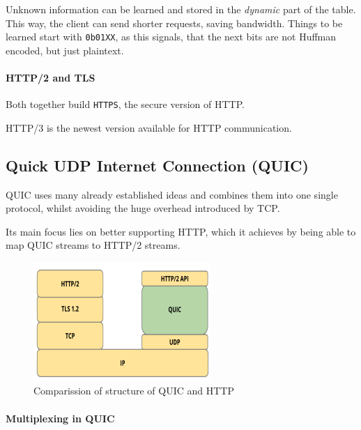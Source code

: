 \documentclass[english]{panikzettel}
\begin{document}
	Unknown information can be learned and stored in the \textit{dynamic} part of the table.
	This way, the client can send shorter requests, saving bandwidth.
	Things to be learned start with \texttt{0b01XX}, as this signals, that the next bits are not Huffman encoded, but just plaintext.
	
	\paragraph{HTTP/2 and TLS}
	\label{pgf-http/2-and-tls}
	
	Both together build \texttt{HTTPS}, the secure version of HTTP.

	\vspace{0.5cm}
	\begin{alertbox}
		HTTP/3 is the newest version available for HTTP communication. 
	\end{alertbox}
	
	\subsection{Quick UDP Internet Connection (QUIC)}
	\label{ss-quick-udp-internet-connection-quic}

	QUIC uses many already established ideas and combines them into one single protocol, whilst avoiding the huge overhead introduced by TCP.

	Its main focus lies on better supporting HTTP, which it achieves by being able to map QUIC streams to HTTP/2 streams.
	
	\begin{figure}[H]
		\centering
		\includegraphics[width=0.6\textwidth]{img/2-quic-vs-http.png}
		\caption{Comparission of structure of QUIC and HTTP}
		\label{img-2-quic-vs-http}
	\end{figure}

	\paragraph{Multiplexing in QUIC}
	\label{pgf-multiplexing-in-quic}
	
\end{document}

